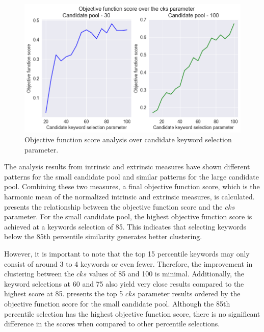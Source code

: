 \begin{figure}[h]
	\centering
	\includegraphics[width=.99\textwidth]{images/subplots/harmonic_score_cks_subplot.png}
	\caption[Objective function score analysis over cks parameter.]{Objective function score analysis over candidate keyword selection parameter. \label{fig:objective_function_vs_csk}}
\end{figure}

The analysis results from intrinsic and extrinsic measures have shown different patterns for the small candidate pool and similar patterns for the large candidate pool. Combining these two measures, a final objective function score, which is the harmonic mean of the normalized intrinsic and extrinsic measures, is calculated.  presents the relationship between the objective function score and the $cks$ parameter. For the small candidate pool, the highest objective function score is achieved at a keywords selection of 85. This indicates that selecting keywords below the 85th percentile similarity generates better clustering.

However, it is important to note that the top 15 percentile keywords may only consist of around 3 to 4 keywords or even fewer. Therefore, the improvement in clustering between the $cks$ values of 85 and 100 is minimal. Additionally, the keyword selections at 60 and 75 also yield very close results compared to the highest score at 85.  presents the top 5 $cks$ parameter results ordered by the objective function score for the small candidate pool. Although the 85th percentile selection has the highest objective function score, there is no significant difference in the scores when compared to other percentile selections.


